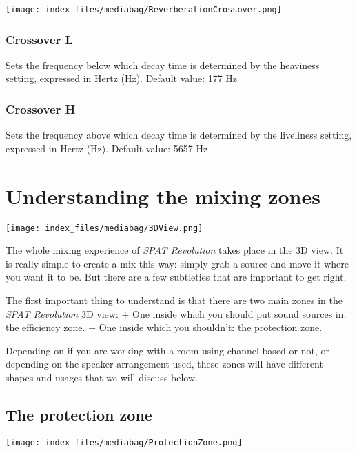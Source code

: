 \documentclass[
  letterpaper,
  DIV=11,
  numbers=noendperiod]{scrreport}
\begin{document}
\texttt{[image: index\_files/mediabag/ReverberationCrossover.png]}

\hypertarget{crossover-l}{%
\subsection{Crossover L}\label{crossover-l}}

Sets the frequency below which decay time is determined by the heaviness
setting, expressed in Hertz (Hz). Default value: 177 Hz

\hypertarget{crossover-h}{%
\subsection{Crossover H}\label{crossover-h}}

Sets the frequency above which decay time is determined by the
liveliness setting, expressed in Hertz (Hz). Default value: 5657 Hz

\hypertarget{understanding-the-mixing-zones}{%
\chapter{Understanding the mixing
zones}\label{understanding-the-mixing-zones}}

\texttt{[image: index\_files/mediabag/3DView.png]}

The whole mixing experience of \emph{SPAT Revolution} takes place in the
3D view. It is really simple to create a mix this way: simply grab a
source and move it where you want it to be. But there are a few
subtleties that are important to get right.

The first important thing to understand is that there are two main zones
in the \emph{SPAT Revolution} 3D view: + One inside which you should put
sound sources in: the efficiency zone. + One inside which you shouldn't:
the protection zone.

Depending on if you are working with a room using channel-based or not,
or depending on the speaker arrangement used, these zones will have
different shapes and usages that we will discuss below.

\hypertarget{sec-about3dview-protectionzone}{%
\section{The protection zone}\label{sec-about3dview-protectionzone}}

\texttt{[image: index\_files/mediabag/ProtectionZone.png]}
\end{document}
